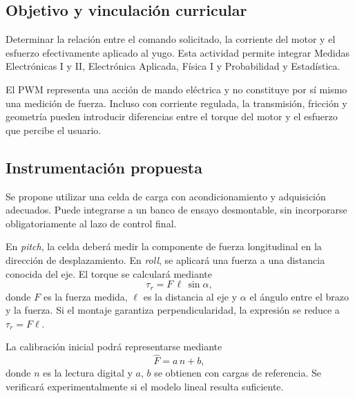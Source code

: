 \documentclass[11pt,a4paper]{article}
\begin{document}
\subsection{Objetivo y vinculación curricular}
Determinar la relación entre el comando solicitado, la corriente del motor
y el esfuerzo efectivamente aplicado al yugo. Esta actividad permite integrar
Medidas Electrónicas I y II, Electrónica Aplicada, Física I y Probabilidad y
Estadística.

El PWM representa una acción de mando eléctrica y no constituye por sí mismo
una medición de fuerza. Incluso con corriente regulada, la transmisión,
fricción y geometría pueden introducir diferencias entre el torque del motor
y el esfuerzo que percibe el usuario.

\subsection{Instrumentación propuesta}
Se propone utilizar una celda de carga con acondicionamiento y adquisición
adecuados. Puede integrarse a un banco de ensayo desmontable, sin incorporarse
obligatoriamente al lazo de control final.

En \textit{pitch}, la celda deberá medir la componente de fuerza longitudinal
en la dirección de desplazamiento. En \textit{roll}, se aplicará una fuerza
a una distancia conocida del eje. El torque se calculará mediante
\begin{equation}
    \tau_r = F\,\ell\,\sin\alpha,
\end{equation}
donde $F$ es la fuerza medida, $\ell$ es la distancia al eje y $\alpha$ el
ángulo entre el brazo y la fuerza. Si el montaje garantiza perpendicularidad,
la expresión se reduce a $\tau_r=F\ell$.

La calibración inicial podrá representarse mediante
\begin{equation}
    \widehat F = a\,n+b,
\end{equation}
donde $n$ es la lectura digital y $a$, $b$ se obtienen con cargas de referencia.
Se verificará experimentalmente si el modelo lineal resulta suficiente.
\end{document}
